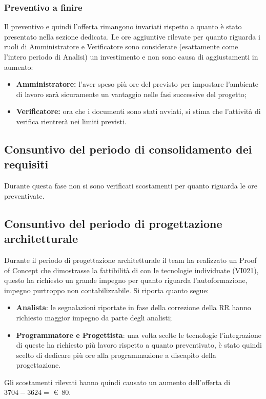 \subsubsection{Preventivo a finire}
Il preventivo e quindi l'offerta rimangono invariati rispetto a quanto è stato presentato nella sezione dedicata. Le ore aggiuntive rilevate per quanto riguarda i ruoli di Amministratore e Verificatore sono considerate (esattamente come l'intero periodo di Analisi) un investimento e non sono causa di aggiustamenti in aumento: 
\begin{itemize}
    \item \textbf{Amministratore:} l'aver speso più ore del previsto per impostare l'ambiente di lavoro sarà sicuramente un vantaggio nelle fasi successive del progetto;
    \item \textbf{Verificatore:} ora che i documenti sono stati avviati, si stima che l'attività di verifica rientrerà nei limiti previsti.
\end{itemize}

\subsection{Consuntivo del periodo di consolidamento dei requisiti}
Durante questa fase non si sono verificati scostamenti per quanto riguarda le ore preventivate. 

\subsection{Consuntivo del periodo di progettazione architetturale}
Durante il periodo di progettazione architetturale il team ha realizzato un Proof of Concept che dimostrasse la fattibilità di \hd con le tecnologie individuate (VI021), questo ha richiesto un grande impegno per quanto riguarda l'autoformazione, impegno purtroppo non contabilizzabile. 
Si riporta quanto segue:
\begin{itemize}
    \item \textbf{Analista}: le segnalazioni riportate in fase della correzione della RR hanno richiesto maggior impegno da parte degli analisti;
    \item \textbf{Programmatore e Progettista}: una volta scelte le tecnologie l'integrazione di queste ha richiesto più lavoro rispetto a quanto preventivato, è stato quindi scelto di dedicare più ore alla programmazione a discapito della progettazione.
\end{itemize}
\def\salarycontent{
    {Amministratore,13,20,260},
    {Analista,$26+\noexpand\textbf{6}$,25,800},
    {Progettista,$62-\noexpand\textbf{10}$,22,1144},
    {Programmatore,41,15,615},
    {Responsabile,9,30,270},
    {Verificatore,41,15,615},
    {Totale,188,127,3704},
}

\noindent Gli scostamenti rilevati hanno quindi causato un aumento dell'offerta di $3704 - 3624 =$ \euro\ 80.

